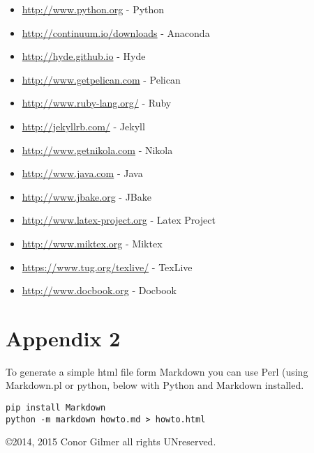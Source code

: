\documentclass[12pt]{article}			%
\begin{document}
\begin{itemize}
\item\url{http://www.python.org} - Python
\item\url{http://continuum.io/downloads} - Anaconda
\item\url{http://hyde.github.io} - Hyde
\item\url{http://www.getpelican.com} - Pelican
\item\url{http://www.ruby-lang.org/} - Ruby
\item\url{http://jekyllrb.com/} - Jekyll
\item\url{http://www.getnikola.com} - Nikola
\item\url{http://www.java.com} - Java
\item\url{http://www.jbake.org} - JBake
\item\url{http://www.latex-project.org} - Latex Project
\item\url{http://www.miktex.org} - Miktex
\item\url{https://www.tug.org/texlive/} - TexLive
\item\url{http://www.docbook.org} - Docbook
\end{itemize}


\section{Appendix 2}
To generate a simple html file form Markdown you can use Perl (using Markdown.pl or python, below with Python and Markdown installed.
\begin{verbatim}
pip install Markdown
python -m markdown howto.md > howto.html
\end{verbatim}

\copyright 2014, 2015 Conor Gilmer  all rights UNreserved.
\end{document}
